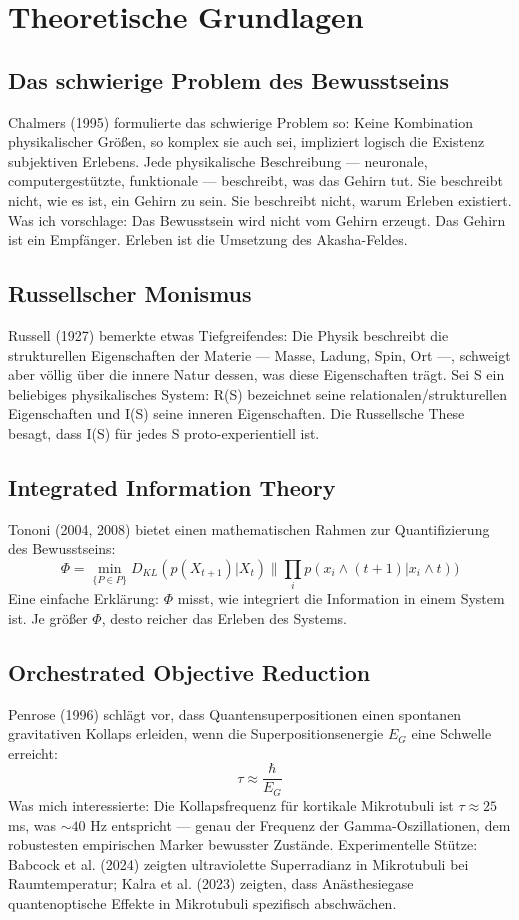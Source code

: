 \section{Theoretische Grundlagen}
\subsection{Das schwierige Problem des Bewusstseins}
Chalmers (1995) formulierte das schwierige Problem so: Keine Kombination physikalischer Größen, so komplex sie auch sei, impliziert logisch die Existenz subjektiven Erlebens. Jede physikalische Beschreibung --- neuronale, computergestützte, funktionale --- beschreibt, was das Gehirn tut. Sie beschreibt nicht, wie es ist, ein Gehirn zu sein. Sie beschreibt nicht, warum Erleben existiert. Was ich vorschlage: Das Bewusstsein wird nicht vom Gehirn erzeugt. Das Gehirn ist ein Empfänger. Erleben ist die Umsetzung des Akasha-Feldes.

\subsection{Russellscher Monismus}
Russell (1927) bemerkte etwas Tiefgreifendes: Die Physik beschreibt die strukturellen Eigenschaften der Materie --- Masse, Ladung, Spin, Ort ---, schweigt aber völlig über die innere Natur dessen, was diese Eigenschaften trägt. Sei S ein beliebiges physikalisches System: R(S) bezeichnet seine relationalen/strukturellen Eigenschaften und I(S) seine inneren Eigenschaften. Die Russellsche These besagt, dass I(S) für jedes S proto-experientiell ist.

\subsection{Integrated Information Theory}
Tononi (2004, 2008) bietet einen mathematischen Rahmen zur Quantifizierung des Bewusstseins:
\begin{equation}
\Phi = \min_{\{P \in P\}} D_{KL}(p(X_{t+1})|X_{t}) \parallel \prod_{i} p(x_{i} \land (t+1)|x_{i} \land t))
\end{equation}
Eine einfache Erklärung: $\Phi$ misst, wie integriert die Information in einem System ist. Je größer $\Phi$, desto reicher das Erleben des Systems.

\subsection{Orchestrated Objective Reduction}
Penrose (1996) schlägt vor, dass Quantensuperpositionen einen spontanen gravitativen Kollaps erleiden, wenn die Superpositionsenergie $E_G$ eine Schwelle erreicht:
\begin{equation}
\tau \approx \frac{\hbar}{E_G}
\end{equation}
Was mich interessierte: Die Kollapsfrequenz für kortikale Mikrotubuli ist $\tau \approx 25$ ms, was $\sim 40$ Hz entspricht --- genau der Frequenz der Gamma-Oszillationen, dem robustesten empirischen Marker bewusster Zustände. Experimentelle Stütze: Babcock et al. (2024) zeigten ultraviolette Superradianz in Mikrotubuli bei Raumtemperatur; Kalra et al. (2023) zeigten, dass Anästhesiegase quantenoptische Effekte in Mikrotubuli spezifisch abschwächen.


